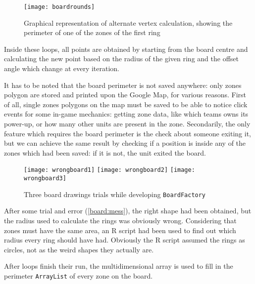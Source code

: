 			\begin{figure}[htp]
				\centering
				\texttt{[image: boardrounds]}
				\caption{Graphical representation of alternate vertex calculation, showing the perimeter of one of the zones of the first ring}\label{board:alternate}
			\end{figure}
			
			Inside these loops, all points are obtained by starting from the board centre and calculating the new point based on the radius of the given ring and the offset angle which change at every iteration.
			
			
			
			It has to be noted that the board perimeter is not saved anywhere: only zones polygon are stored and printed upon the Google Map, for various reasons.
			First of all, single zones polygons on the map must be saved to be able to notice click events for some in-game mechanics: getting zone data, like which teams owns its power-up, or how many other units are present in the zone.
			Secondarily, the only feature which requires the board perimeter is the check about someone exiting it, but we can achieve the same result by checking if a position is inside any of the zones which had been saved: if it is not, the unit exited the board.
			
			\begin{figure}[htp]
				\centering
				\texttt{[image: wrongboard1]}
				\hfill %
				\texttt{[image: wrongboard2]}
				\hfill
				\texttt{[image: wrongboard3]}
				
				\caption{Three board drawings trials while developing \lstinline|BoardFactory|}\label{board:mess}
			\end{figure}
			
			After some trial and error (\autoref{board:mess}), the right shape had been obtained, but the radius used to calculate the rings was obviously wrong.
			Considering that zones must have the same area, an R script had been used to find out which radius every ring should have had. Obviously the R script assumed the rings as circles, not as the weird shapes they actually are.
			
			After loops finish their run, the multidimensional array is used to fill in the perimeter \lstinline|ArrayList| of every zone on the board.
			
